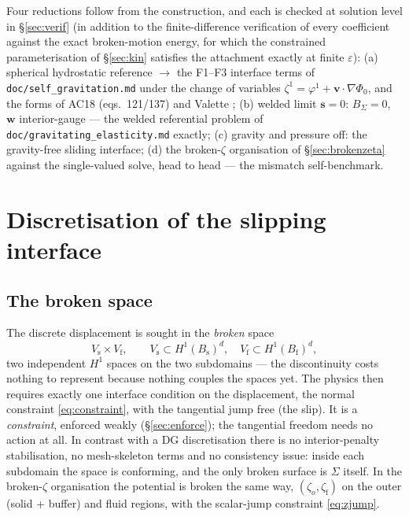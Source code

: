 \documentclass[11pt]{article}
\newcommand{\eps}{\varepsilon}
\newcommand{\Bs}{B_{\mathrm{s}}}
\newcommand{\Bf}{B_{\mathrm{f}}}
\newcommand{\bs}{\mathbf{s}}
\newcommand{\bv}{\mathbf{v}}
\newcommand{\bw}{\mathbf{w}}
\begin{document}
Four reductions follow from the construction, and each is checked at
solution level in \S\ref{sec:verif} (in addition to the
finite-difference verification of every coefficient against the exact
broken-motion energy, for which the constrained parameterisation of
\S\ref{sec:kin} satisfies the attachment exactly at finite $\eps$):
(a) spherical hydrostatic reference $\to$ the F1--F3 interface terms
of \texttt{doc/self\_gravitation.md} under the change of variables
$\zeta^1 = \varphi^1 + \bv\cdot\nabla\Phi_0$, and the forms of AC18
(eqs.~121/137) \cite{AC18} and Valette \cite{Valette1986,Valette1991};
(b) welded limit $\bs = 0$: $B_\Sigma = 0$, $\bw$ interior-gauge --- the
welded referential problem of \texttt{doc/gravitating\_elasticity.md}
exactly; (c) gravity and pressure off: the gravity-free sliding
interface; (d) the broken-$\zeta$ organisation of
\S\ref{sec:brokenzeta} against the single-valued solve, head to head
--- the mismatch self-benchmark.

\section{Discretisation of the slipping interface}
\label{sec:disc}

\subsection{The broken space}

The discrete displacement is sought in the \emph{broken} space
\begin{equation}
  V_{\mathrm{s}} \times V_{\mathrm{f}}, \qquad
  V_{\mathrm{s}} \subset H^{1}(\Bs)^{d}, \quad
  V_{\mathrm{f}} \subset H^{1}(\Bf)^{d},
\end{equation}
two independent $H^{1}$ spaces on the two subdomains --- the
discontinuity costs nothing to represent because nothing couples the
spaces yet. The physics then requires exactly one interface condition on
the displacement, the normal constraint \eqref{eq:constraint}, with the
tangential jump free (the slip). It is a \emph{constraint}, enforced
weakly (\S\ref{sec:enforce}); the tangential freedom needs no action at
all. In contrast with a DG discretisation there is no interior-penalty
stabilisation, no mesh-skeleton terms and no consistency issue: inside
each subdomain the space is conforming, and the only broken surface is
$\Sigma$ itself. In the broken-$\zeta$ organisation the potential is
broken the same way, $(\zeta_o, \zeta_{\mathrm{f}})$ on the outer (solid
+ buffer) and fluid regions, with the scalar-jump constraint
\eqref{eq:zjump}.
\end{document}
